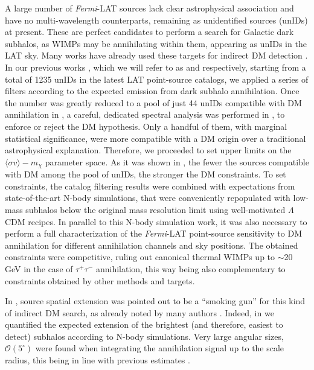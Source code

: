 \documentclass[%
 reprint,
nofootinbib,
 amsmath,amssymb,
 aps,
]{revtex4-2}
\begin{document}
A large number of \textit{Fermi}-LAT sources lack clear astrophysical association and have no multi-wavelength counterparts, remaining as unidentified sources (unIDs) at present. These are perfect candidates to perform a search for Galactic dark subhalos, as WIMPs may be annihilating within them, appearing as unIDs in the LAT sky. Many works have already used these targets for indirect DM detection \cite{Bertoni+15, Bertoni+16, Calore+17, Schoonenberg+16,Hooper_2017,BerlinHooper14, Zechlin+12, ZechlinHorns12, Belikov2012, BuckleyHooper10, fermi_dm_satellites_paper, CoronadoBlazquez2020, coronadoblazquez2021sensitivity}. {  In our previous works \citep{CoronadoBlazquez2019a,CoronadoBlazquez2019b}, which we will refer to as 
 and  respectively,} starting from a total of 1235 unIDs in the latest LAT point-source catalogs, we applied a series of filters according to the expected emission from dark subhalo annihilation. Once the number was greatly reduced to a pool of just 44 unIDs compatible with DM annihilation in , a careful, dedicated spectral analysis was performed in , to enforce or reject the DM hypothesis. Only a handful of them, with marginal statistical significance, were more compatible with a DM origin over a traditional astrophysical explanation. Therefore, we proceeded to set upper limits on the $\langle\sigma v\rangle-m_{\chi}$ parameter space. As it was shown in , the fewer the sources compatible with DM among the pool of unIDs, the stronger the DM constraints. To set constraints, the catalog filtering results were combined with expectations from state-of-the-art N-body simulations, that were conveniently repopulated with low-mass subhalos below the original mass resolution limit using well-motivated $\Lambda$CDM recipes. In parallel to this N-body simulation work, it was also necessary to perform a full characterization of the \textit{Fermi}-LAT point-source sensitivity to DM annihilation for different annihilation channels and sky positions. The obtained constraints were competitive, ruling out canonical thermal WIMPs up to $\sim$20 GeV in the case of $\tau^+\tau^-$ annihilation, this way being also complementary to constraints obtained by other methods and targets.

In , source spatial extension was pointed out to be a ``smoking gun'' for this kind of indirect DM search, as already noted by many authors \cite{Bertoni+15,Bertoni+16,Hooper_2017,Xia2017,Facchinetti2020,Mauro2020}. {  Indeed, in  we quantified the expected extension of the brightest (and therefore, easiest to detect) subhalos according to N-body simulations. Very large angular sizes, $\mathcal{O}(5^\circ)$ were found when integrating the annihilation signal up to the scale radius, this being in line with previous estimates \citep{hutten16,Mauro2020}.}
\end{document}

